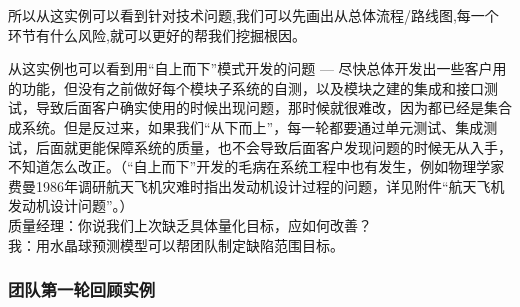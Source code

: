 
所以从这实例可以看到针对技术问题,我们可以先画出从总体流程/路线图,每一个环节有什么风险,就可以更好的帮我们挖掘根因。

从这实例也可以看到用“自上而下”模式开发的问题 ---  尽快总体开发出一些客户用的功能，但没有之前做好每个模块子系统的自测，以及模块之建的集成和接口测试，导致后面客户确实使用的时候出现问题，那时候就很难改，因为都已经是集合成系统。但是反过来，如果我们“从下而上”，每一轮都要通过单元测试、集成测试，后面就更能保障系统的质量，也不会导致后面客户发现问题的时候无从入手，不知道怎么改正。（“自上而下”开发的毛病在系统工程中也有发生，例如物理学家费曼1986年调研航天飞机灾难时指出发动机设计过程的问题，详见附件“航天飞机发动机设计问题”。）\\

质量经理：你说我们上次缺乏具体量化目标，应如何改善？\\
我：用水晶球预测模型可以帮团队制定缺陷范围目标。\\

\hypertarget{ux56e2ux961fux7b2cux4e00ux8f6eux56deux987eux5b9eux4f8b}{%
\subsubsection{团队第一轮回顾实例}\label{ux56e2ux961fux7b2cux4e00ux8f6eux56deux987eux5b9eux4f8b}}

